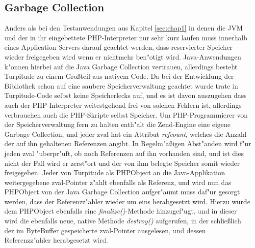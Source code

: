 \subsection{Garbage Collection}
\label{sec:chap2:turp:zendgc}

Anders als bei den Testanwendungen aus Kapitel \ref{sec:chap1} in denen die JVM und der in ihr eingebettete PHP-Interpreter
nur sehr kurz laufen muss innerhalb eines Application Servers darauf geachtet werden, dass reservierter Speicher
wieder freigegeben wird wenn er nichtmehr ben"otigt wird. Java-Anwendungen k"onnen hierbei auf die Java Garbage Collection
vertrauen, allerdings besteht Turpitude zu einem Gro\ss teil aus nativem Code. Da bei der Entwicklung der Bibliothek schon
auf eine saubere Speicherverwaltung geachtet wurde trate in Turpitude-Code selbst keine Speicherlecks auf, und es ist
davon auszugehen dass auch der PHP-Interpreter weitestgehend frei von solchen Fehlern ist, allerdings verbrauchen auch
die PHP-Skripte selbst Speicher. Um PHP-Programmierer von der Speicherverwaltung fern zu halten enth"alt die Zend-Engine 
eine eigene Garbage Collection, und jeder zval hat ein Attribut \emph{refcount}, welches die Anzahl der auf ihn gehaltenen
Referenzen angibt. In Regelm"a\ss igen Abst"anden wird f"ur jeden zval "uberpr"uft, ob noch Referenzen auf ihn vorhanden sind,
und ist dies nicht der Fall wird er zerst"ort und der von ihm belegte Speicher somit wieder freigegeben.
Jeder von Turpitude als PHPObject an die Java-Applikation weitergegebene zval-Pointer z"ahlt ebenfalls als Referenz,
und wird nun das PHPObject von der Java Garbage Collection aufger"aumt muss daf"ur gesorgt werden, dass der
Referenzz"ahler wieder um eins herabgesetzt wird.
Hierzu wurde dem PHPObject ebenfalls eine \emph{finalize()}-Methode hinzugef"ugt, und in dieser wird die ebenfalls neue,
native Methode \emph{destroy()} aufgerufen, in der schlie\ss lich der im ByteBuffer gespeicherte zval-Pointer
ausgelesen, und dessen Referenzz"ahler herabgesetzt wird.



